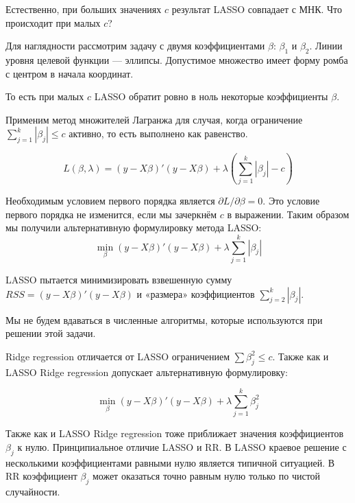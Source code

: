 \documentclass[12pt, a4paper]{article}\usepackage[]{graphicx}\usepackage[]{color}
\begin{document}
Естественно, при больших значениях $c$ результат LASSO совпадает с МНК. Что происходит при малых $c$?


Для наглядности рассмотрим задачу с двумя коэффициентами $\beta$: $\beta_1$ и $\beta_2$. Линии уровня целевой функции — эллипсы. Допустимое множество имеет форму ромба с центром в начала координат.




То есть при малых $c$ LASSO обратит ровно в ноль некоторые коэффициенты $\beta$.


Применим метод множителей Лагранжа для случая, когда ограничение $\sum_{j=1}^{k}|\beta_j|\leq c$ активно, то есть выполнено как равенство.

\begin{equation}
L(\beta,\lambda)=(y-X\beta)'(y-X\beta)+\lambda \left(\sum_{j=1}^{k}|\beta_j| - c \right)
\end{equation}

Необходимым условием первого порядка является $\partial L/\partial \beta =0$.
Это условие первого порядка не изменится, если мы зачеркнём $c$ в выражении.
Таким образом мы получили альтернативную формулировку метода LASSO:
\begin{equation}
\min_{\beta} (y-X\beta)'(y-X\beta)+\lambda \sum_{j=1}^{k}|\beta_j|
\end{equation}

LASSO пытается минимизировать взвешенную сумму $RSS=(y-X\beta)'(y-X\beta)$ и «размера» коэффициентов $\sum_{j=2}^{k}|\beta_j|$.


Мы не будем вдаваться в численные алгоритмы, которые используются при решении этой задачи.


Ridge regression отличается от LASSO ограничением $\sum \beta_j^2\leq c$.
Также как и LASSO Ridge regression допускает альтернативную формулировку:

\begin{equation}
\min_{\beta} (y-X\beta)'(y-X\beta)+\lambda \sum_{j=1}^{k} \beta_j^2
\end{equation}

Также как и LASSO Ridge regression тоже приближает значения коэффициентов $\beta_j$ к нулю.
Принципиальное отличие LASSO и RR.
В LASSO краевое решение с несколькими коэффициентами равными нулю является типичной ситуацией.
В RR коэффициент $\beta_j$ может оказаться точно равным нулю только по чистой случайности.
\end{document}
